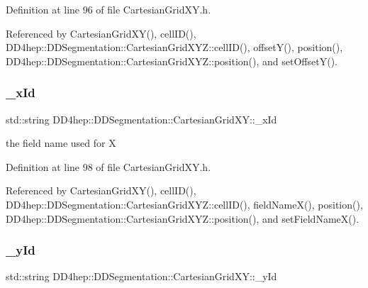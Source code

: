 Definition at line 96 of file Cartesian\+Grid\+X\+Y.\+h.



Referenced by Cartesian\+Grid\+X\+Y(), cell\+I\+D(), D\+D4hep\+::\+D\+D\+Segmentation\+::\+Cartesian\+Grid\+X\+Y\+Z\+::cell\+I\+D(), offset\+Y(), position(), D\+D4hep\+::\+D\+D\+Segmentation\+::\+Cartesian\+Grid\+X\+Y\+Z\+::position(), and set\+Offset\+Y().

\hypertarget{class_d_d4hep_1_1_d_d_segmentation_1_1_cartesian_grid_x_y_a5d3ac6b5ea83c88420aba7ea9a05dff3}{}\label{class_d_d4hep_1_1_d_d_segmentation_1_1_cartesian_grid_x_y_a5d3ac6b5ea83c88420aba7ea9a05dff3} 
\subsubsection{\texorpdfstring{\+\_\+x\+Id}{\_xId}}
{\footnotesize\ttfamily std\+::string D\+D4hep\+::\+D\+D\+Segmentation\+::\+Cartesian\+Grid\+X\+Y\+::\+\_\+x\+Id\hspace{0.3cm}{\ttfamily [protected]}}



the field name used for X 



Definition at line 98 of file Cartesian\+Grid\+X\+Y.\+h.



Referenced by Cartesian\+Grid\+X\+Y(), cell\+I\+D(), D\+D4hep\+::\+D\+D\+Segmentation\+::\+Cartesian\+Grid\+X\+Y\+Z\+::cell\+I\+D(), field\+Name\+X(), position(), D\+D4hep\+::\+D\+D\+Segmentation\+::\+Cartesian\+Grid\+X\+Y\+Z\+::position(), and set\+Field\+Name\+X().

\hypertarget{class_d_d4hep_1_1_d_d_segmentation_1_1_cartesian_grid_x_y_af310e0e896cdddee02bf71b0cf6559a0}{}\label{class_d_d4hep_1_1_d_d_segmentation_1_1_cartesian_grid_x_y_af310e0e896cdddee02bf71b0cf6559a0} 
\subsubsection{\texorpdfstring{\+\_\+y\+Id}{\_yId}}
{\footnotesize\ttfamily std\+::string D\+D4hep\+::\+D\+D\+Segmentation\+::\+Cartesian\+Grid\+X\+Y\+::\+\_\+y\+Id\hspace{0.3cm}{\ttfamily [protected]}}



